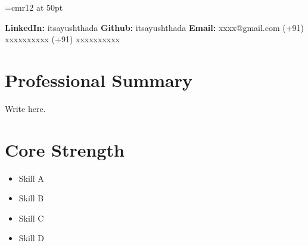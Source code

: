 \documentclass{article}
\begin{document}
    
    \title{}
    
    \noindent
    \begin{minipage}[c]{0.7 \linewidth}
        \font\myfont=cmr12 at 50pt
            {}
    \end{minipage}
    \begin{minipage}[c]{0.3 \linewidth}
        \begin{flushright}
            \mbox{}\hfill \textbf{LinkedIn:} itsayushthada \newline
            \mbox{}\hfill \textbf{Github:} itsayushthada \newline
            \mbox{}\hfill \textbf{Email:} xxxx@gmail.com \newline
            \mbox{}\hfill (+91) xxxxxxxxxx \newline
            \mbox{}\hfill (+91) xxxxxxxxxx \newline
        \end{flushright}
    \end{minipage}
    
    
    \section{Professional Summary}
        Write here.
    
    \section{Core Strength}
    \begin{multicols}{2}
        \begin{itemize}
            \item  Skill A
            \item  Skill B
            \item  Skill C
            \item  Skill D
        \end{itemize}
    \end{multicols}
    
    
\end{document}
